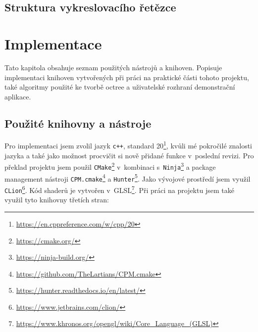 \section{Struktura vykreslovacího řetězce}


\chapter{Implementace}
\label{implementace}

Tato kapitola obsahuje seznam použitých nástrojů a knihoven. Popisuje implementaci knihoven vytvořených při práci na praktické části tohoto projektu, také algoritmy použité ke tvorbě octree a uživatelské rozhraní demonstrační aplikace.

\section{Použité knihovny a nástroje}
Pro implementaci jsem zvolil jazyk \texttt{c++}, standard 20\footnote{\url{https://en.cppreference.com/w/cpp/20}}, kvůli mé pokročilé znalosti jazyka a také jako možnost procvičit si nově přidané funkce v~poslední revizi. Pro překlad projektu jsem použil \texttt{CMake}\footnote{\url{https://cmake.org/}} v~kombinaci s~\texttt{Ninja}\footnote{\url{https://ninja-build.org/}} a package management nástroji \texttt{CPM.cmake}\footnote{\url{https://github.com/TheLartians/CPM.cmake}} a \texttt{Hunter}\footnote{\url{https://hunter.readthedocs.io/en/latest/}}. Jako vývojové prostředí jsem využil \texttt{CLion}\footnote{\url{https://www.jetbrains.com/clion/}}. Kód shaderů je vytvořen v~GLSL\footnote{\url{https://www.khronos.org/opengl/wiki/Core_Language_(GLSL)}}. Při práci na projektu jsem také využil tyto knihovny třetích stran:


